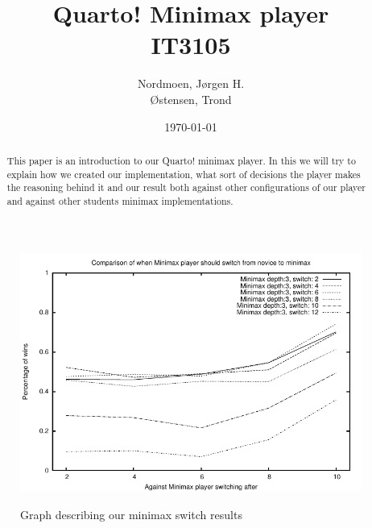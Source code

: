 \documentclass[titlepage, a4paper]{article}
\title{
	Quarto! Minimax player \\
	IT3105 \\
}
\author{
	Nordmoen, Jørgen H. \\
	Østensen, Trond
}
\date{\today}
\begin{document}
\maketitle

\begin{abstract}\label{abstract}
	This paper is an introduction to our Quarto! minimax player. In this we will try to
	explain how we created our implementation, what sort of decisions the player makes
	the reasoning behind it and our result both against other configurations of our player
	and against other students minimax implementations.
\end{abstract}

\newpage
\tableofcontents

\begin{figure}[htb]
	\includegraphics{graphs/switch.pdf}
	\label{fig:minimax switch}
	\caption{Graph describing our minimax switch results}
\end{figure}

\end{document}

